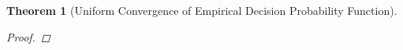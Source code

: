 \documentclass{article}
\newtheorem{theorem}{Theorem}[section]
\begin{document}
\begin{theorem}[Uniform Convergence of Empirical Decision Probability Function]
\begin{proof}
			
%			
%			
%			
%			

\end{proof}
\end{theorem}
\end{document}
